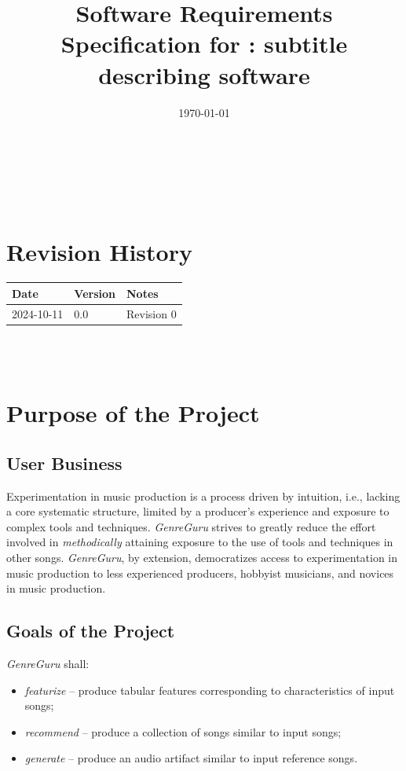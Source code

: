 \documentclass[12pt]{article}
\begin{document}
\title{Software Requirements Specification for \progname: subtitle describing software} 
\author{\authname}
\date{\today}
	
\maketitle

~\newpage


\tableofcontents

~\newpage

\section*{Revision History}

\begin{tabularx}{\textwidth}{p{3cm}p{2cm}X}
\toprule {\textbf{Date}} & {\textbf{Version}} & {\textbf{Notes}}\\
\midrule
2024-10-11 & 0.0 & Revision 0\\
\bottomrule
\end{tabularx}

~\\

~\newpage
\section{Purpose of the Project}
\subsection{User Business}
Experimentation in music production is a process driven by intuition, i.e., lacking a core systematic structure, limited by a producer's experience and exposure to complex tools and techniques. \emph{GenreGuru} strives to greatly reduce the effort involved in \emph{methodically} attaining exposure to the use of tools and techniques in other songs. \emph{GenreGuru}, by extension, democratizes access to experimentation in music production to less experienced producers, hobbyist musicians, and novices in music production.
\subsection{Goals of the Project}
\emph{GenreGuru} shall:
\begin{itemize}
  \item \emph{featurize} -- produce tabular features corresponding to characteristics of input songs;
  \item \emph{recommend} -- produce a collection of songs similar to input songs;
  \item \emph{generate} -- produce an audio artifact similar to input reference songs.
\end{itemize}
\end{document}
